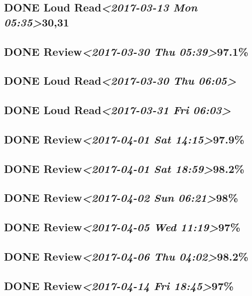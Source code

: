 \documentclass[11pt]{ctexart}
\begin{document}
\subsection{{\bfseries\sffamily DONE} Loud Read\textit{<2017-03-13 Mon 05:35>}30,31}
\label{sec:org225b8e0}
\subsection{{\bfseries\sffamily DONE} Review\textit{<2017-03-30 Thu 05:39>}97.1\%}
\label{sec:orgb76f49d}
\subsection{{\bfseries\sffamily DONE} Loud Read\textit{<2017-03-30 Thu 06:05>}}
\label{sec:org6b44cfb}
\subsection{{\bfseries\sffamily DONE} Loud Read\textit{<2017-03-31 Fri 06:03>}}
\label{sec:orgf26653f}
\subsection{{\bfseries\sffamily DONE} Review\textit{<2017-04-01 Sat 14:15>}97.9\%}
\label{sec:orgce8320e}
\subsection{{\bfseries\sffamily DONE} Review\textit{<2017-04-01 Sat 18:59>}98.2\%}
\label{sec:org7b6d132}
\subsection{{\bfseries\sffamily DONE} Review\textit{<2017-04-02 Sun 06:21>}98\%}
\label{sec:orgb4f204b}
\subsection{{\bfseries\sffamily DONE} Review\textit{<2017-04-05 Wed 11:19>}97\%}
\label{sec:org43b3967}
\subsection{{\bfseries\sffamily DONE} Review\textit{<2017-04-06 Thu 04:02>}98.2\%}
\label{sec:org4efa5f8}
\subsection{{\bfseries\sffamily DONE} Review\textit{<2017-04-14 Fri 18:45>}97\%}
\label{sec:org9cbcf0d}
\end{document}
